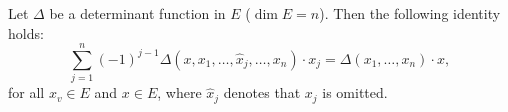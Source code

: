 Let $\Delta$ be a determinant function in $E$ ($\dim E = n$). Then the following identity holds:
$$\sum_{j=1}^{n} (-1)^{j-1} \Delta(x, x_1, \ldots, \hat{x}_j, \ldots, x_n) \cdot x_j = \Delta(x_1, \ldots, x_n) \cdot x,$$
for all $x_v \in E$ and $x \in E$, where $\hat{x}_j$ denotes that $x_j$ is omitted.
